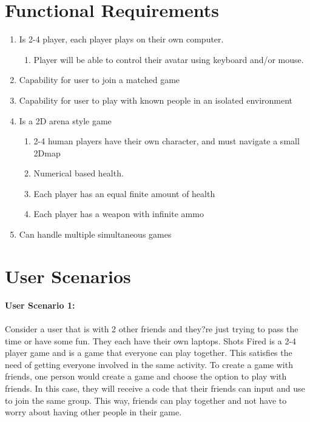 \documentclass[11pt, oneside]{article}   	%
\begin{document}
\clearpage

\section{Functional Requirements}
\begin{enumerate}
\item Is 2-4 player, each player plays on their own computer. 
\begin{enumerate}
\item Player will be able to control their avatar using keyboard and/or mouse. 
\end{enumerate}
\item Capability for user to join a matched game
\item Capability for user to play with known people in an isolated environment
\item Is a 2D arena style game
\begin{enumerate}
\item 2-4 human players have their own character, and must navigate a small 2Dmap
\item Numerical based health.
\item Each player has an equal finite amount of health
\item Each player has a weapon with infinite ammo
\end{enumerate}
\item Can handle multiple simultaneous games
\end{enumerate}

\section{User Scenarios}


\textbf{User Scenario 1:}\\\\
Consider a user that is with 2 other friends and they?re just trying to pass the time or have some fun. They each have their own laptops. Shots Fired is a 2-4 player game and is a game that everyone can play together. This satisfies the need of getting everyone involved in the same activity. To create a game with friends, one person would create a game and choose the option to play with friends. In this case, they will receive a code that their friends can input and use to join the same group. This way, friends can play together and not have to worry about having other people in their game. \\
\end{document}

